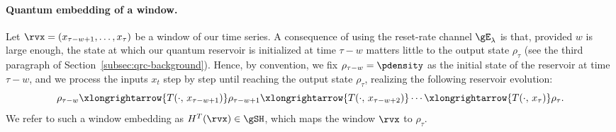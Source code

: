 \paragraph{Quantum embedding of a window.}\label{par:quantum-embedding} Let $\rvx = (x_{\tau-w+1}, \ldots, x_{\tau})$ be a window of our time series. A consequence of using the reset-rate channel $\gE_\lambda$ is that, provided $w$ is large enough, the state at which our quantum reservoir is initialized at time $\tau-w$ matters little to the output state $\rho_\tau$ (see the third paragraph of Section~\ref{subsec:qrc-background}). Hence, by convention, we fix $\rho_{\tau-w} = \pdensity$ as the initial state of the reservoir at time $\tau-w$, and we process the inputs $x_t$ step by step until reaching the output state $\rho_\tau$, realizing the following reservoir evolution:
\begin{equation}
    \rho_{\tau-w} \xlongrightarrow{T(\cdot, \, x_{\tau - w + 1})} \rho_{\tau-w+1} \xlongrightarrow{T(\cdot, \, x_{\tau - w + 2})} \cdots \xlongrightarrow{T(\cdot, \, x_{\tau})} \rho_{\tau}.
\end{equation}
We refer to such a window embedding as $H^T(\rvx) \in \gSH$, which maps the window $\rvx$ to $\rho_\tau$.

